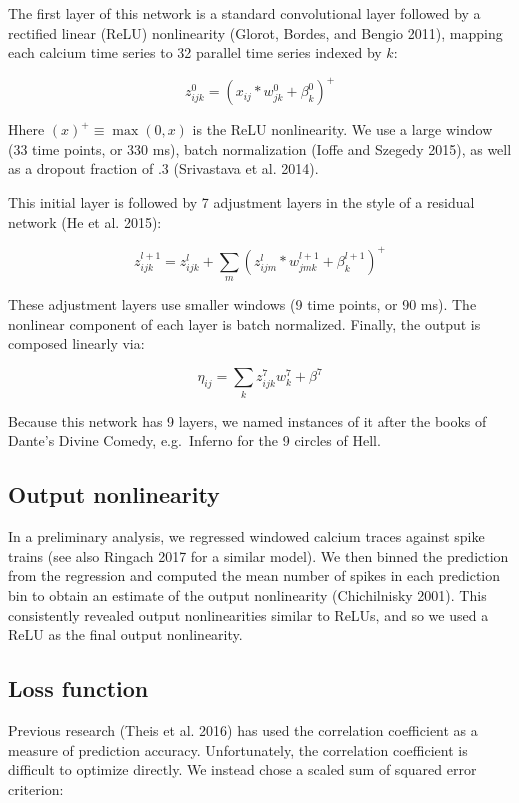 \documentclass[]{article}
\begin{document}
The first layer of this network is a standard convolutional layer
followed by a rectified linear (ReLU) nonlinearity (Glorot, Bordes, and
Bengio 2011), mapping each calcium time series to 32 parallel time
series indexed by \(k\):

\[
z^0_{ijk} = (x_{ij} * w_{jk}^0 + \beta_k^0)^+
\]

Hhere \((x)^+ \equiv \max(0, x)\) is the ReLU nonlinearity. We use a
large window (33 time points, or 330 ms), batch normalization (Ioffe and
Szegedy 2015), as well as a dropout fraction of .3 (Srivastava et al.
2014).

This initial layer is followed by 7 adjustment layers in the style of a
residual network (He et al. 2015):

\[z^{l + 1}_{ijk} = z_{ijk}^l + \sum_m (z_{ijm}^l * w_{jmk}^{l + 1} + \beta_{k}^{l+1})^+\]

These adjustment layers use smaller windows (9 time points, or 90 ms).
The nonlinear component of each layer is batch normalized. Finally, the
output is composed linearly via:

\[\eta_{ij} = \sum_k z_{ijk}^{7}w^7_k + \beta^7\]

Because this network has 9 layers, we named instances of it after the
books of Dante's Divine Comedy, e.g.~Inferno for the 9 circles of Hell.

\subsection{Output nonlinearity}\label{output-nonlinearity}

In a preliminary analysis, we regressed windowed calcium traces against
spike trains (see also Ringach 2017 for a similar model). We then binned
the prediction from the regression and computed the mean number of
spikes in each prediction bin to obtain an estimate of the output
nonlinearity (Chichilnisky 2001). This consistently revealed output
nonlinearities similar to ReLUs, and so we used a ReLU as the final
output nonlinearity.

\subsection{Loss function}\label{loss-function}

Previous research (Theis et al. 2016) has used the correlation
coefficient as a measure of prediction accuracy. Unfortunately, the
correlation coefficient is difficult to optimize directly. We instead
chose a scaled sum of squared error criterion:
\end{document}
